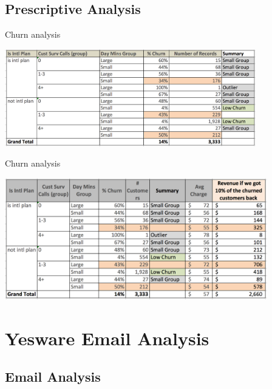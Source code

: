 \documentclass[10pt]{beamer}
\begin{document}
  \subsection{Prescriptive Analysis}

    \begin{frame}{Churn analysis}
      \begin{center}
        \includegraphics[height=120pt]{../graphs/churn_analysis}
      \end{center}
    \end{frame}

    \begin{frame}{Churn analysis}
      \begin{center}
        \includegraphics[height=150pt]{../graphs/churn_analysis_revenue}
      \end{center}
    \end{frame}

\section{Yesware Email Analysis}

  \subsection{Email Analysis}
\end{document}
